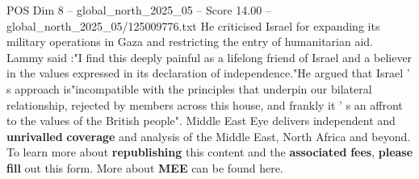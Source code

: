 \begin{textsample}{POS Dim 8 – global\_north\_2025\_05 – Score 14.00 – global\_north\_2025\_05/125009776.txt}
He criticised Israel for expanding its military operations in Gaza and restricting the entry of humanitarian aid.
Lammy said :"I find this deeply painful as a lifelong friend of Israel and a believer in the values expressed in its declaration of independence."He argued that Israel ' s approach is"incompatible with the principles that underpin our bilateral relationship, rejected by members across this house, and frankly it ' s an affront to the values of the British people".
Middle East Eye delivers independent and \textbf{unrivalled} \textbf{coverage} and analysis of the Middle East, North Africa and beyond.
To learn more about \textbf{republishing} this content and the \textbf{associated} \textbf{fees}, \textbf{please} \textbf{fill} out this form.
More about \textbf{MEE} can be found here.

\end{textsample}
